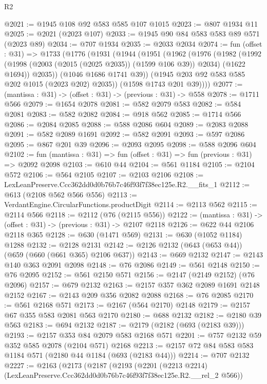 \begin{lexlean}{R2}
\begin{coremodule}
@2021 := @1945 @108 @92 @583 @585 @107 @1015
@2023 := @807 @1934 @11
@2025 := @2021 (@2023 @107)
@2033 := @1945 @90 @84 @583 @583 @89 @571 (@2023 @89)
@2034 := @707 @1934
@2035 := @2033 @2034
@2074 := fun (offset : @31) =>
  @1733
    (@1776
      (@1931
        (@1944
          (@1951
            (@1962
              (@1976
                (@1982
                  (@1992 (@1998 (@2003 (@2015 (@2025 @2035)) (@1599 @106 @39)) @2034) (@1622 @1694))
                  @2035))
              (@1046 @1686 @1741 @39))
            (@1945 @203 @92 @583 @585 @202 @1015 (@2023 @202) @2035))
          (@1598 @1743 @201 @39))))
@2077 := (mantissa : @31) -> (offset : @31) -> (previous : @31) -> @558
@2078 := @1711 @566
@2079 := @1654 @2078
@2081 := @582 @2079 @583
@2082 := @584 @2081
@2083 := @582 @2082
@2084 := @918 @562
@2085 := @1714 @566
@2086 := @2084 @2085
@2088 := @588 @2086 @604
@2089 := @2083 @2088
@2091 := @582 @2089 @1691
@2092 := @582 @2091
@2093 := @597 @2086
@2095 := @867 @201 @39
@2096 := @2093 @2095
@2098 := @588 @2096 @604
@2102 := fun (mantissa : @31) => fun (offset : @31) => fun (previous : @31) => @2092 @2098
@2103 := @610 @44
@2104 := @561 @1184
@2105 := @2104 @572
@2106 := @564 @2105
@2107 := @2103 @2106
@2108 := LexLeanPreserve.Ccc362dd0d0b76b7c46f93f7f38ec125e.R2.__fits_1
@2112 := @613 (@2108 @562 @566 @556)
@2113 := VerdantEngine.CircularFunctions.productDigit
@2114 := @2113 @562
@2115 := @2114 @566
@2118 := @2112 (@76 (@2115 @556))
@2122 := (mantissa : @31) -> (offset : @31) -> (previous : @31) -> @2107 @2118
@2126 := @622 @44 @2106 @2118 @365
@2128 := @630 (@1471 @569)
@2131 := @630 (@1052 @1184) @1288
@2132 := @2128 @2131
@2142 := @2126 @2132 (@643 (@653 @44)) (@659 (@660 (@661 @365) @2106 @637))
@2143 := @669 @2132
@2147 := @2143 @140 @363 @2091 @2098
@2148 := @76 @2086
@2149 := @561 @2148
@2150 := @76 @2095
@2152 := @561 @2150 @571
@2156 := @2147 (@2149 @2152) (@76 @2096)
@2157 := @679 @2132
@2163 := @2157 @357 @362 @2089 @1691 @2148 @2152
@2167 := @2143 @209 @356 @2082 @2088
@2168 := @76 @2085
@2170 := @561 @2168 @571
@2173 := @2167 (@564 @2170) @2148
@2179 := @2157 @67 @355 @583 @2081 @563 @2170
@2180 := @688 @2132
@2182 := @2180 @39 @563
@2183 := @694 @2132
@2187 := @2179 (@2182 (@693 (@2183 @39)))
@2193 := @2157 @353 @84 @2079 @583 @2168 @571
@2201 := @757 @2132 @59 @352 @585 @2078 (@2104 @571) @2168
@2213 := @2157 @72 @84 @583 @583 @1184 @571 (@2180 @44 @1184 (@693 (@2183 @44)))
@2214 := @707 @2132
@2227 := @2163
    (@2173
      (@2187
        (@2193
          (@2201 (@2213 @2214) (LexLeanPreserve.Ccc362dd0d0b76b7c46f93f7f38ec125e.R2.__rel_2 @566))

\end{coremodule}
\end{lexlean}
